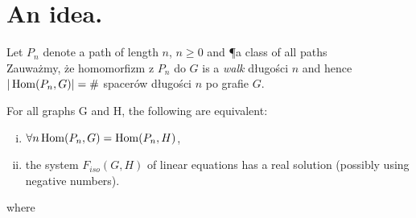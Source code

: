 \section{An idea.}
Let $P_n$ denote a path of length $n$, $n \geq 0$ and \P a class of all paths \\
	Zauważmy, że homomorfizm z $P_n$ do $G$ is a \emph{walk} długości $n$ and hence
	$| \operatorname{Hom}(P_n, G) | = \#$ spacerów długości $n$ po grafie $G$.\\
\begin{tw}
	For all graphs G and H, the following are equivalent: 
	\begin{enumerate}[(i)]
		\item $\forall n \operatorname{Hom}(P_n, G) = \operatorname{Hom}(P_n, H)$,
		\item the system $F_{iso}(G,H)$ of linear equations
		has a real solution (possibly using negative numbers).
	\end{enumerate}
\end{tw}
where
